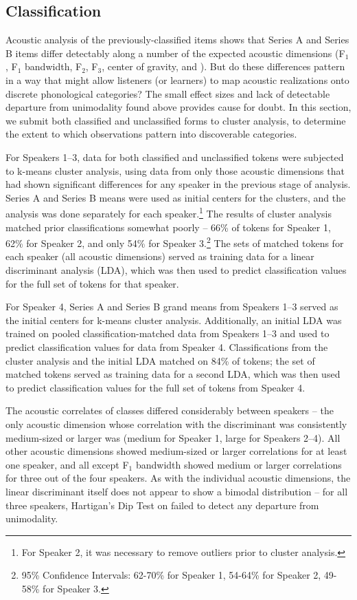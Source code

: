 \documentclass[output=paper,newtxmath,modfonts,nonflat,hidelinks]{langsci/langscibook}
\begin{document}
\subsection{Classification}
\label{classification}

Acoustic analysis of the previously-classified items shows that Series A and Series B items differ detectably along a number of the expected acoustic dimensions (F$_1$, F$_1$ bandwidth, F$_2$, F$_3$, center of gravity, and ).  But do these differences pattern in a way that might allow listeners (or learners) to map acoustic realizations onto discrete phonological categories?  The small effect sizes and lack of detectable departure from unimodality found above provides cause for doubt.  In this section, we submit both classified and unclassified forms to cluster analysis, to determine the extent to which observations pattern into discoverable categories.

For Speakers 1--3, data for both classified and unclassified tokens were subjected to k-means cluster analysis, using data from only those acoustic dimensions that had shown significant differences for any speaker in the previous stage of analysis.  Series A and Series B means were used as initial centers for the clusters, and the analysis was done separately for each speaker.\footnote{For Speaker 2, it was necessary to remove outliers prior to cluster analysis.} The results of cluster analysis matched prior classifications somewhat poorly -- 66\% of tokens for Speaker 1, 62\% for Speaker 2, and only 54\% for Speaker 3.\footnote{95\% Confidence Intervals: 62-70\% for Speaker 1, 54-64\% for Speaker 2, 49-58\% for Speaker 3.}  The sets of matched tokens for each speaker (all acoustic dimensions) served as training data for a linear discriminant analysis (LDA), which was then used to predict classification values for the full set of tokens for that speaker.

For Speaker 4, Series A and Series B grand means from Speakers 1--3 served as the initial centers for k-means cluster analysis.  Additionally, an initial LDA was trained on pooled classification-matched data from Speakers 1--3 and used to predict classification values for data from Speaker 4.  Classifications from the cluster analysis and the initial LDA matched on 84\% of tokens; the set of matched tokens served as training data for a second LDA, which was then used to predict classification values for the full set of tokens from Speaker 4.

The acoustic correlates of classes differed considerably between speakers -- the only acoustic dimension whose correlation with the discriminant was consistently medium-sized or larger was  (medium for Speaker 1, large for Speakers 2--4).  All other acoustic dimensions showed medium-sized or larger correlations for at least one speaker, and all except F$_1$ bandwidth showed medium or larger correlations for three out of the four speakers.  As with the individual acoustic dimensions, the linear discriminant itself does not appear to show a bimodal distribution -- for all three speakers, Hartigan's Dip Test on failed to detect any departure from unimodality.
\end{document}

